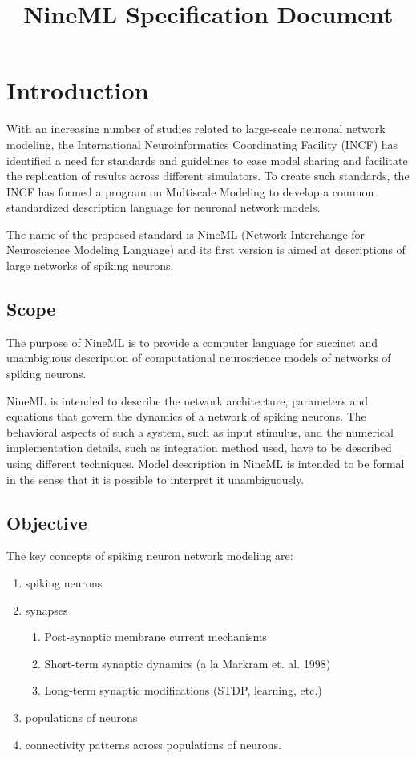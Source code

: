 \documentclass[a4paper]{article}
\begin{document}
\title{NineML Specification Document}

\newpage
\pagestyle{plain}

\tableofcontents

\section{Introduction}

With an increasing number of studies related to large-scale neuronal
network modeling, the International Neuroinformatics Coordinating
Facility (INCF) has identified a need for standards and guidelines to
ease model sharing and facilitate the replication of results across
different simulators. To create such standards, the INCF has formed a
program on Multiscale Modeling to develop a common standardized
description language for neuronal network models.

The name of the proposed standard is NineML (Network Interchange for
Neuroscience Modeling Language) and its first version is aimed at
descriptions of large networks of spiking neurons.

\subsection{Scope}

The purpose of NineML is to provide a computer language for
succinct and unambiguous description of computational neuroscience models of
networks of spiking neurons.

NineML is intended to describe the network architecture, parameters
and equations that govern the dynamics of a network of spiking
neurons. The behavioral aspects of such a system, such as input
stimulus, and the numerical implementation details, such as
integration method used, have to be described using different
techniques.  Model description in NineML is intended to be formal in
the sense that it is possible to interpret it unambiguously.

\subsection{Objective}

The key concepts of spiking neuron network modeling are:

\begin{enumerate}
\item spiking neurons
\item synapses
\begin{enumerate}
\item Post-synaptic membrane current mechanisms
\item Short-term synaptic dynamics (a la Markram et. al. 1998)
\item Long-term synaptic modifications (STDP, learning, etc.)
\end{enumerate}
\item populations of neurons
\item connectivity patterns across populations of neurons.
\end{enumerate}
\end{document}
